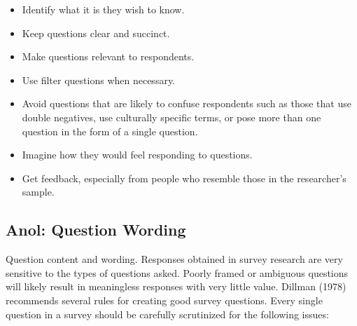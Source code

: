 \begin{itemize}
	\item Identify what it is they wish to know.
	\item Keep questions clear and succinct.
	\item Make questions relevant to respondents.
	\item Use filter questions when necessary.
	\item Avoid questions that are likely to confuse respondents such as those that use double negatives, use culturally specific terms, or pose more than one question in the form of a single question.
	\item Imagine how they would feel responding to questions.
	\item Get feedback, especially from people who resemble those in the researcher’s sample.
\end{itemize}

\subsection{Anol: Question Wording}

Question content and wording. Responses obtained in survey research are very sensitive to the types of questions asked. Poorly framed or ambiguous questions will likely result in meaningless responses with very little value. Dillman (1978) recommends several rules for creating good survey questions. Every single question in a survey should be carefully scrutinized for the following issues:

